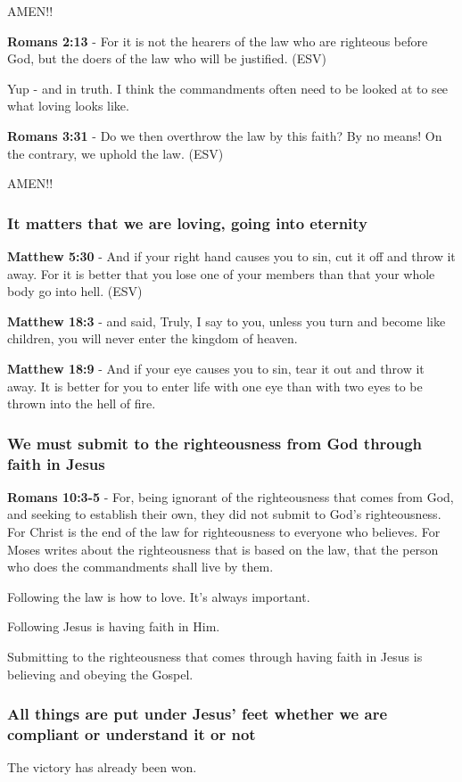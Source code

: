 \documentclass[11pt]{article}
\begin{document}
AMEN!!

\textbf{Romans 2:13} - For it is not the hearers of the law who are righteous before God, but the doers of the law who will be justified. (ESV)

Yup - and in truth. I think the commandments often need to be looked at to see what loving looks like.

\textbf{Romans 3:31} - Do we then overthrow the law by this faith? By no means! On the contrary, we uphold the law. (ESV)

AMEN!!

\subsubsection{It matters that we are loving, going into eternity}
\label{sec:orgde5ead7}
\textbf{Matthew 5:30} - And if your right hand causes you to sin, cut it off and throw it away. For it is better that you lose one of your members than that your whole body go into hell. (ESV)

\textbf{Matthew 18:3} - and said, Truly, I say to you, unless you turn and become like children, you will never enter the kingdom of heaven.

\textbf{Matthew 18:9} - And if your eye causes you to sin, tear it out and throw it away. It is better for you to enter life with one eye than with two eyes to be thrown into the hell of fire.

\subsubsection{We must submit to the righteousness from God through faith in Jesus}
\label{sec:org6610160}
\textbf{Romans 10:3-5} - For, being ignorant of the righteousness that comes from God, and seeking to establish their own, they did not submit to God's righteousness. For Christ is the end of the law for righteousness to everyone who believes. For Moses writes about the righteousness that is based on the law, that the person who does the commandments shall live by them.

Following the law is how to love. It's always important.

Following Jesus is having faith in Him.

Submitting to the righteousness that comes through having faith in Jesus is believing and obeying the Gospel.

\subsubsection{All things \textbf{are} put under Jesus' feet whether we are compliant or understand it or not}
\label{sec:org6c8b725}
The victory has already been won.
\end{document}
